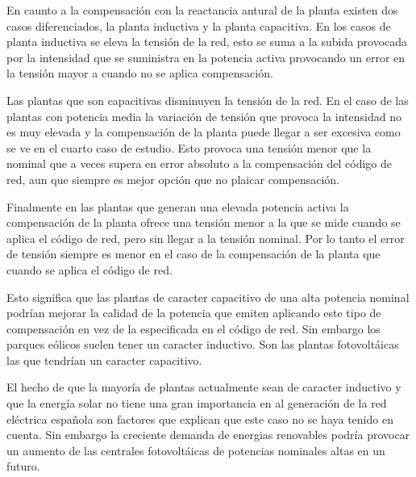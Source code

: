 \documentclass{book}
\begin{document}
En caunto a la compensaci\'on con la reactancia antural de la planta existen dos casos diferenciados, la planta inductiva y la planta capacitiva. En los casos de planta inductiva se eleva la tensi\'on de la red, esto se suma a la subida provocada por la intensidad que se suministra en la potencia activa provocando un error en la tensi\'on mayor a cuando no se aplica compensaci\'on. \par

Las plantas que son capacitivas disminuyen la tensi\'on de la red. En el caso de las plantas con potencia media la variaci\'on de tensi\'on que provoca la intensidad no es muy elevada y la compensaci\'on de la planta puede llegar a ser excesiva como se ve en el cuarto caso de estudio. Esto provoca una tensi\'on menor que la nominal que a veces supera en error absoluto a la compensaci\'on del c\'odigo de red, aun que siempre es mejor opci\'on que no plaicar compensaci\'on. \par

Finalmente en las plantas que generan una elevada potencia activa la compensaci\'on de la planta ofrece una tensi\'on menor a la que se mide cuando se aplica el c\'odigo de red, pero sin llegar a la tensi\'on nominal. Por lo tanto el error de tensi\'on siempre es menor en el caso de la compensaci\'on de la planta que cuando se aplica el c\'odigo de red. \par

Esto significa que las plantas de caracter capacitivo de una alta potencia nominal podr\'ian mejorar la calidad de la potencia que emiten aplicando este tipo de compensaci\'on en vez de la especificada en el c\'odigo de red. Sin embargo los parques e\'olicos suelen tener un caracter inductivo. Son las plantas fotovolt\'aicas las que tendr\'ian un caracter capacitivo. \par

El hecho de que la mayor\'ia de plantas actualmente sean de caracter inductivo y que la energ\'ia solar no tiene una gran importancia en al generaci\'on de la red el\'ectrica española son factores que explican que este caso no se haya tenido en cuenta. Sin embargo la creciente demanda de energias renovables podr\'ia provocar un aumento de las centrales fotovolt\'aicas de potencias nominales altas en un futuro. \par




\end{document}
